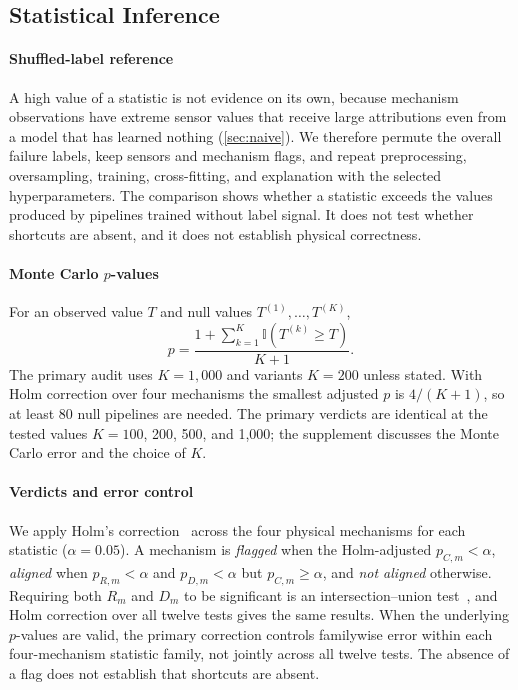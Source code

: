 \documentclass[conference]{IEEEtran}
\begin{document}
\subsection{Statistical Inference}
\label{sec:nulls}

\paragraph{Shuffled-label reference} A high value of a statistic is not evidence on its own, because mechanism observations have extreme sensor values that receive large attributions even from a model that has learned nothing (\cref{sec:naive}). We therefore permute the overall failure labels, keep sensors and mechanism flags, and repeat preprocessing, oversampling, training, cross-fitting, and explanation with the selected hyperparameters. The comparison shows whether a statistic exceeds the values produced by pipelines trained without label signal. It does not test whether shortcuts are absent, and it does not establish physical correctness.

\paragraph{Monte Carlo $p$-values} For an observed value $T$ and null values $T^{(1)},\ldots,T^{(K)}$,
\begin{equation}
p=\frac{1+\sum_{k=1}^{K}\mathbb{I}(T^{(k)}\geq T)}{K+1}.
\label{eq:pvalue}
\end{equation}
The primary audit uses $K=1{,}000$ and variants $K=200$ unless stated. With Holm correction over four mechanisms the smallest adjusted $p$ is $4/(K+1)$, so at least 80 null pipelines are needed. The primary verdicts are identical at the tested values $K=100$, 200, 500, and 1{,}000; the supplement discusses the Monte Carlo error and the choice of $K$.

\paragraph{Verdicts and error control} We apply Holm's correction~\cite{holm1979simple} across the four physical mechanisms for each statistic ($\alpha=0.05$). A mechanism is \emph{flagged} when the Holm-adjusted $p_{C,m}<\alpha$, \emph{aligned} when $p_{R,m}<\alpha$ and $p_{D,m}<\alpha$ but $p_{C,m}\geq\alpha$, and \emph{not aligned} otherwise. Requiring both $R_m$ and $D_m$ to be significant is an intersection--union test~\cite{berger1982iut}, and Holm correction over all twelve tests gives the same results. When the underlying $p$-values are valid, the primary correction controls familywise error within each four-mechanism statistic family, not jointly across all twelve tests. The absence of a flag does not establish that shortcuts are absent.
\end{document}
